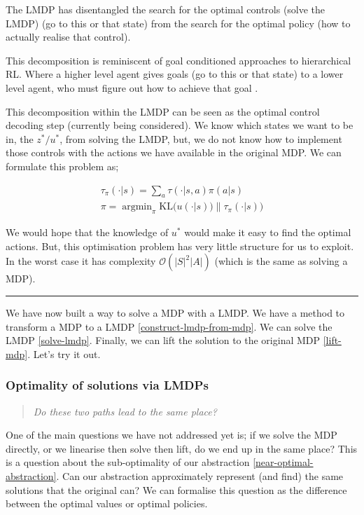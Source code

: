 The LMDP has disentangled the search for the optimal controls (solve the LMDP) (go to this or
that state) from the search for the optimal policy (how to actually
realise that control).

This decomposition is reminiscent of goal conditioned approaches to hierarchical RL.
Where a higher level agent gives goals (go to this or that state) to a lower level
agent, who must figure out how to achieve that goal \cite{Vezhnevets2017}.

This decomposition within the LMDP can be seen as the optimal control decoding
step (currently being considered). We know which
states we want to be in, the $z^{* } / u^{* }$, from solving the LMDP, but,
we do not know how to implement those controls with the actions we have available in the original MDP.
We can formulate this problem as;

\begin{align}
\tau_{\pi}(\cdot | s) = \sum_a \tau(\cdot | s, a) \pi(a | s) \\
\pi = \mathop{\text{argmin}}_{\pi} \text{KL}\Big(u(\cdot | s))\parallel \tau_{\pi}(\cdot | s)\Big)
\end{align}

We would hope that the knowledge of $u^{* }$ would make it easy to find the optimal actions.
But, this optimisation problem has very little structure for us to exploit.
In the worst case it has complexity $\mathcal O(|S|^2|A|)$ (which is the same as solving a MDP).

\begin{center}\rule{0.5\linewidth}{\linethickness}\end{center}

We have now built a way to solve a MDP with a LMDP.
We have a method to transform a MDP to a LMDP \ref{construct-lmdp-from-mdp}.
We can solve the LMDP \ref{solve-lmdp}.
Finally, we can lift the solution to the original MDP \ref{lift-mdp}.
Let's try it out.

\subsubsection{Optimality of solutions via LMDPs}\label{paths}

\begin{quote}
\textsl{Do these two paths lead to the same place?}
\end{quote}

One of the main questions we have not addressed yet is; if we solve the
MDP directly, or we linearise then solve then lift, do we end up in the same
place? This is a question about the sub-optimality of our abstraction \ref{near-optimal-abstraction}. Can
our abstraction approximately represent (and find) the same solutions that the
original can? We can formalise this question as the difference between the optimal values or optimal policies.

